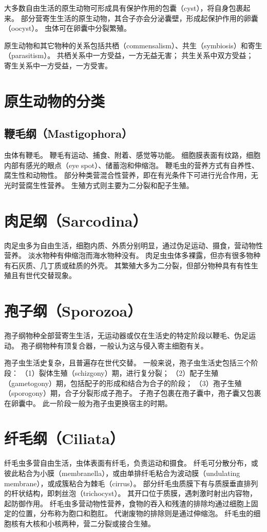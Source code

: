 \documentclass[11pt]{article}
\begin{document}
\newline

大多数自由生活的原生动物可形成具有保护作用的包囊（cyst），将自身包裹起来。
部分营寄生生活的原生动物，其合子亦会分泌囊壁，形成起保护作用的卵囊（oocyst）。
虫体可在卵囊中分裂繁殖。

\newline

原生动物和其它物种的关系包括共栖（commensalism）、共生（symbiosis）和寄生（parasitism）。
共栖关系中一方受益，一方无益无害；
共生关系中双方受益；
寄生关系中一方受益，一方受害。

\section{原生动物的分类}
\subsection{鞭毛纲（Mastigophora）}
虫体有鞭毛。
鞭毛有运动、捕食、附着、感觉等功能。
细胞膜表面有纹路，细胞内部有感光的眼点（eye spot）、储蓄泡和伸缩泡。
鞭毛虫的营养方式有自养性、腐生性和动物性。
部分种类营混合性营养，即在有光条件下可进行光合作用，无光时营腐生性营养。
生殖方式则主要为二分裂和配子生殖。

\section{肉足纲（Sarcodina）}
肉足虫多为自由生活，细胞内质、外质分别明显，通过伪足运动、摄食，营动物性营养。
淡水物种有伸缩泡而海水物种没有。
肉足虫虫体多裸露，但亦有很多物种有石灰质、几丁质或硅质的外壳。
其繁殖大多为二分裂，但部分物种具有有性生殖且有世代交替现象。

\section{孢子纲（Sporozoa）}
孢子纲物种全部营寄生生活，无运动器或仅在生活史的特定阶段以鞭毛、伪足运动。
孢子纲物种有顶复合器，一般认为这与侵入寄主细胞有关。

\newline

孢子虫生活史复杂，且普遍存在世代交替。
一般来说，孢子虫生活史包括三个阶段：
（1）裂体生殖（schizgony）期，进行复分裂；
（2）配子生殖（gametogony）期，包括配子的形成和结合为合子的阶段；
（3）孢子生殖（sporogony）期，合子分裂形成子孢子。
子孢子包裹在孢子囊中，孢子囊又包裹在卵囊中。
此一阶段一般为孢子虫更换宿主的时期。

\section{纤毛纲（Ciliata）}
纤毛虫多营自由生活，虫体表面有纤毛，负责运动和摄食。
纤毛可分散分布，或彼此粘合为小膜（membranella），或由单排纤毛粘合为波动膜（undulating membrane），或成簇粘合为棘毛（cirrus）。
部分纤毛虫质膜下有与质膜垂直排列的杆状结构，即刺丝泡（trichocyst）。
其开口位于质膜，遇刺激时射出内容物，起防御作用。
纤毛虫多营动物性营养，食物的吞入和残渣的排除均通过细胞上固定的位置，分布称为胞口和胞肛。
代谢废物的排除则是通过伸缩泡。
纤毛虫的细胞核有大核和小核两种，营二分裂或接合生殖。
\end{document}
